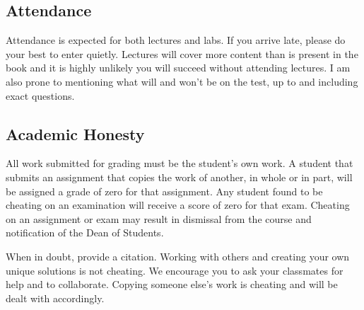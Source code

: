 \documentclass[10pt, letter]{article}
\begin{document}




\subsection*{Attendance}
Attendance is expected for both lectures and labs.  
If you arrive late, please do your best to enter quietly.  
Lectures will cover more content than is present in the book and it is highly unlikely you will succeed without attending lectures.
I am also prone to mentioning what will and won't be on the test, up to and including exact questions.



\subsection*{Academic Honesty}
All work submitted for grading must be the student's own work. A student that submits an assignment that copies the work of another, in whole or in part, will be assigned a grade of zero for that assignment. Any student found to be cheating on an examination will receive a score of zero for that exam. Cheating on an assignment or exam may result in dismissal from the course and notification of the Dean of Students.

When in doubt, provide a citation.
Working with others and creating your own unique solutions is not cheating.
We encourage you to ask your classmates for help and to collaborate.
Copying someone else's work is cheating and will be dealt with accordingly.
\end{document}
